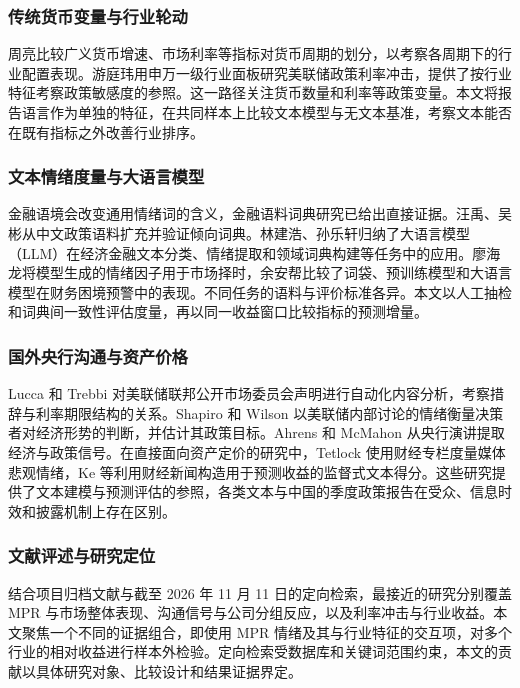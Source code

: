 \subsubsection{传统货币变量与行业轮动}
周亮比较广义货币增速、市场利率等指标对货币周期的划分，以考察各周期下的行业配置表现\cite{zhouLiang2018}。游庭玮用申万一级行业面板研究美联储政策利率冲击，提供了按行业特征考察政策敏感度的参照\cite{youTingwei2026}。这一路径关注货币数量和利率等政策变量。本文将报告语言作为单独的特征，在共同样本上比较文本模型与无文本基准，考察文本能否在既有指标之外改善行业排序。

\subsubsection{文本情绪度量与大语言模型}
金融语境会改变通用情绪词的含义，金融语料词典研究已给出直接证据\cite{loughranMcDonald2011}。汪禹、吴彬从中文政策语料扩充并验证倾向词典\cite{wangWu2025}。林建浩、孙乐轩归纳了大语言模型（LLM）在经济金融文本分类、情绪提取和领域词典构建等任务中的应用\cite{linSun2025}。廖海龙将模型生成的情绪因子用于市场择时，余安帮比较了词袋、预训练模型和大语言模型在财务困境预警中的表现\cite{liaoHailong2026,yuAnbang2026}。不同任务的语料与评价标准各异。本文以人工抽检和词典间一致性评估度量，再以同一收益窗口比较指标的预测增量。

\subsubsection{国外央行沟通与资产价格}
Lucca 和 Trebbi 对美联储联邦公开市场委员会声明进行自动化内容分析，考察措辞与利率期限结构的关系\cite{luccaTrebbi2009}。Shapiro 和 Wilson 以美联储内部讨论的情绪衡量决策者对经济形势的判断，并估计其政策目标\cite{shapiroWilson2022}。Ahrens 和 McMahon 从央行演讲提取经济与政策信号\cite{ahrensMcMahon2021}。在直接面向资产定价的研究中，Tetlock 使用财经专栏度量媒体悲观情绪，Ke 等利用财经新闻构造用于预测收益的监督式文本得分\cite{tetlock2007,keKellyXiu2019}。这些研究提供了文本建模与预测评估的参照，各类文本与中国的季度政策报告在受众、信息时效和披露机制上存在区别。

\subsubsection{文献评述与研究定位}
结合项目归档文献与截至 2026 年 11 月 11 日的定向检索，最接近的研究分别覆盖 MPR 与市场整体表现、沟通信号与公司分组反应，以及利率冲击与行业收益。本文聚焦一个不同的证据组合，即使用 MPR 情绪及其与行业特征的交互项，对多个行业的相对收益进行样本外检验。定向检索受数据库和关键词范围约束，本文的贡献以具体研究对象、比较设计和结果证据界定。

